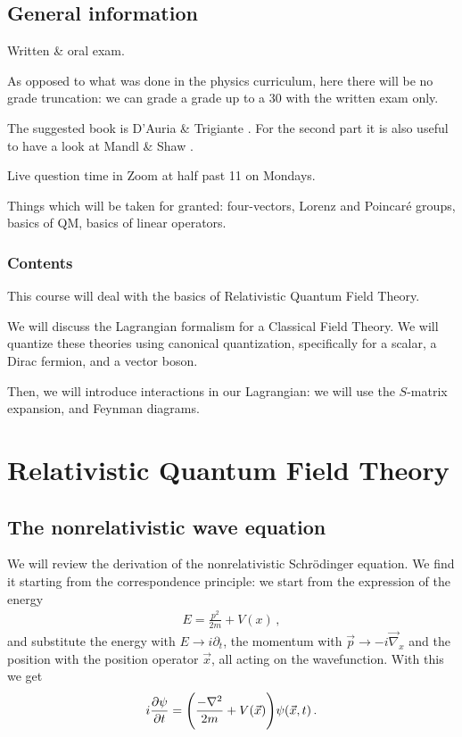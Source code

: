 \documentclass[main.tex]{subfiles}
\begin{document}

\section*{General information}

Written \& oral exam. 

As opposed to what was done in the physics curriculum, here there will be no grade truncation: we can grade a grade up to a 30 with the written exam only.

The suggested book is D'Auria \& Trigiante \cite{dauriaSpecialRelativityFeynman2011}. 
For the second part it is also useful to have a look at Mandl \& Shaw \cite{mandlQuantumFieldTheory2010}.


Live question time in Zoom at half past 11 on Mondays. 

Things which will be taken for granted: four-vectors, Lorenz and Poincaré groups, basics of QM, basics of linear operators. 

\subsection*{Contents}

This course will deal with the basics of Relativistic Quantum Field Theory. 

We will discuss the Lagrangian formalism for a Classical Field Theory. 
We will quantize these theories using canonical quantization, specifically for a scalar, a Dirac fermion, and a vector boson. 

Then, we will introduce interactions in our Lagrangian: we will use the \(S\)-matrix expansion, and Feynman diagrams. 

\chapter{Relativistic Quantum Field Theory}

\section{The nonrelativistic wave equation}

We will review the derivation of the nonrelativistic Schrödinger equation. 
We find it starting from the correspondence principle: we start from the expression of the energy 
%
\begin{align}
E = \frac{p^2}{2m} + V(x)
\,,
\end{align}
%
and substitute the energy with \(E \rightarrow i \partial_{t}\), the momentum with \(\vec{p} \rightarrow - i \vec{\nabla}_{x}\) and the position with the position operator \(\vec{x}\), all acting on the wavefunction.
With this we get 
%
\begin{align}
i \pdv{\psi }{t} (\vec{x}, t)
= \qty(\frac{-\nabla^2 }{2m}+  V(\vec{x})) \psi (\vec{x}, t) 
\,.
\end{align}
%
\end{document}

